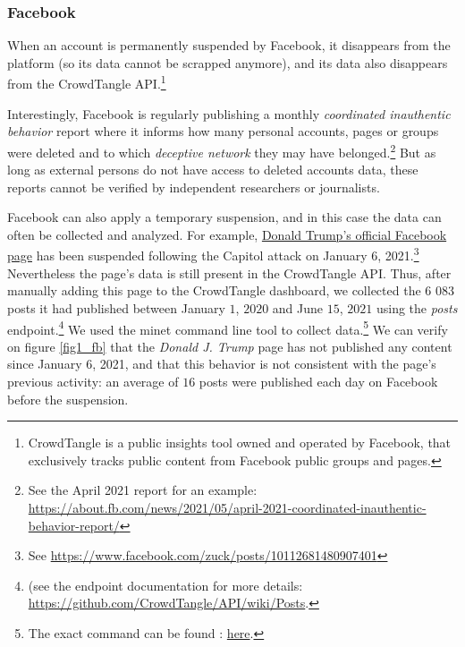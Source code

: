 \documentclass[11pt,a4paper]{article}
\begin{document}

\smallskip

\subsubsection{Facebook}

When an account is permanently suspended by Facebook, it disappears from the platform (so its data cannot be scrapped anymore), and its data also disappears from the CrowdTangle API.\footnote{CrowdTangle is a public insights tool owned and operated by Facebook, that exclusively tracks public content from Facebook public groups and pages.} 

Interestingly, Facebook is regularly publishing a monthly {\it coordinated inauthentic behavior} report where it informs how many personal accounts, pages or groups were deleted and to which {\it deceptive network} they may have belonged.\footnote{See the April 2021 report for an example: \href{https://about.fb.com/news/2021/05/april-2021-coordinated-inauthentic-behavior-report/}{https://about.fb.com/news/2021/05/april-2021-coordinated-inauthentic-behavior-report/}} But as long as external persons do not have access to deleted accounts data, these reports cannot be verified by independent researchers or journalists.

Facebook can also apply a temporary suspension, and in this case the data can often be collected and analyzed. For example, \href{https://www.facebook.com/DonaldTrump/}{Donald Trump’s official Facebook page}  has been suspended following the Capitol attack on January 6, 2021.\footnote{See \href{https://www.facebook.com/zuck/posts/10112681480907401}{https://www.facebook.com/zuck/posts/10112681480907401}} Nevertheless the page’s data is still present in the CrowdTangle API. Thus, after manually adding this page to the CrowdTangle dashboard, we collected the $6$ $083$ posts it had published between January $1$, $2020$ and June $15$, $2021$ using the {\it posts} endpoint.\footnote{ (see the endpoint documentation for more details: \href{https://github.com/CrowdTangle/API/wiki/Posts}{https://github.com/CrowdTangle/API/wiki/Posts}.} We used the minet command line tool \cite{minet} to collect data.\footnote{The exact command can be found : \href{https://github.com/medialab/truth-and-trust-online-2021/blob/master/code/collect_facebook_crowdtangle_trump_data.sh}{here}.} We can verify on figure \ref{fig1_fb} that the {\it Donald J. Trump} page has not published any content since January $6$, 2021, and that this behavior is not consistent with the page’s previous activity: an average of $16$ posts were published each day on Facebook before the suspension. 
\end{document}
